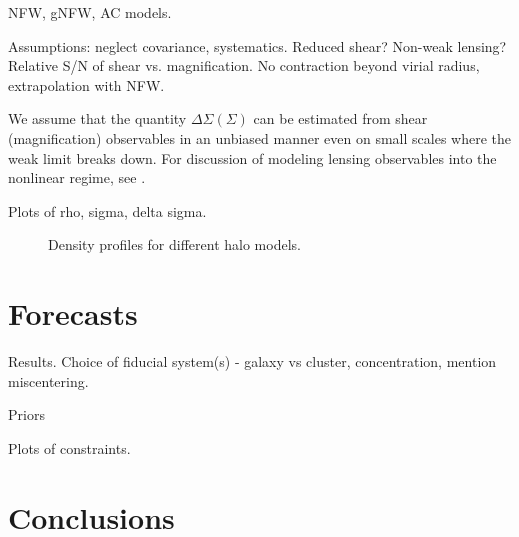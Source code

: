 \documentclass[12pt]{emulateapj}
\begin{document}
NFW, gNFW, AC models.

Assumptions: neglect covariance, systematics. Reduced shear? Non-weak
lensing? Relative S/N of shear vs. magnification. No contraction
beyond virial radius, extrapolation with NFW.

We assume that the quantity $\Delta\Sigma (\Sigma)$ can be estimated
from shear (magnification) observables in an unbiased manner even on
small scales where the weak limit breaks down. For discussion of
modeling lensing observables into the nonlinear regime, see
\citet{Menard2003, Takada2003, Mandelbaum2006}.

Plots of rho, sigma, delta sigma.

\begin{figure*}[htb]
\caption{Density profiles for different halo models.}
\label{fig:compareAC}
\end{figure*}


\section{Forecasts}

Results. Choice of fiducial system(s) - galaxy vs cluster, concentration, mention
miscentering.

Priors

Plots of constraints.

\section{Conclusions}



\acknowledgments 

\mbox{~} %


%



\end{document}
